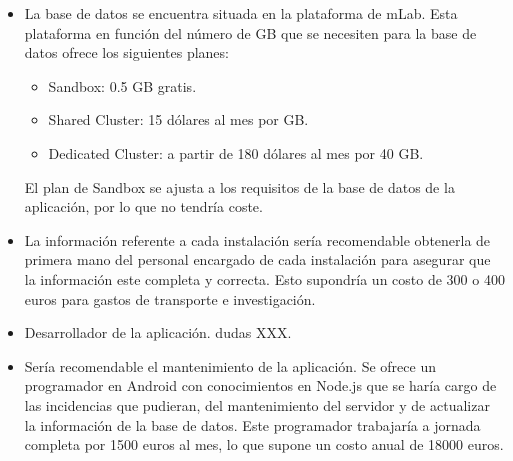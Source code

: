 \begin{itemize}
    \item La base de datos se encuentra situada en la plataforma de mLab. Esta plataforma en función del número de GB que se necesiten para la base de datos ofrece los siguientes planes:
    \begin{itemize}
        \item Sandbox: 0.5 GB gratis. 
        \item Shared Cluster: 15 dólares al mes por GB.
        \item Dedicated Cluster: a partir de 180 dólares al mes por 40 GB. 
    \end{itemize} 

    El plan de Sandbox se ajusta a los requisitos de la base de datos de la aplicación, por lo que no tendría coste. 
    
    \item La información referente a cada instalación sería recomendable obtenerla de primera mano del personal encargado de cada instalación para asegurar que la información este completa y correcta. Esto supondría un costo de 300 o 400 euros para gastos de transporte e investigación.
    \item Desarrollador de la aplicación. dudas XXX.
    \item Sería recomendable el mantenimiento de la aplicación. Se ofrece un programador en Android con conocimientos en Node.js que se haría cargo de las incidencias que pudieran, del mantenimiento del servidor y de actualizar la información de la base de datos. Este programador trabajaría a jornada completa por  1500 euros al mes, lo que supone  un costo anual de 18000 euros.  
\end{itemize}  

